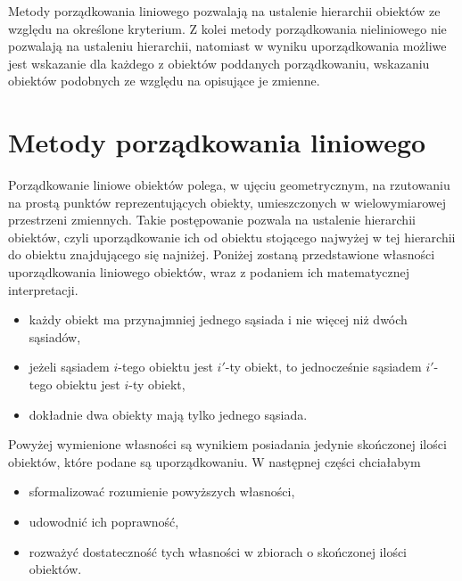 \documentclass[12pt,a4paper]{report}
\begin{document}
Metody porządkowania liniowego pozwalają na ustalenie hierarchii obiektów ze względu na określone kryterium. Z kolei metody porządkowania nieliniowego nie pozwalają na ustaleniu hierarchii, natomiast w wyniku uporządkowania możliwe jest wskazanie dla każdego z obiektów poddanych porządkowaniu, wskazaniu obiektów podobnych ze względu na opisujące je zmienne. 

\section{Metody porządkowania liniowego}
\noindent

Porządkowanie liniowe obiektów polega, w ujęciu geometrycznym, na rzutowaniu na prostą punktów reprezentujących obiekty, umieszczonych w wielowymiarowej przestrzeni zmiennych. Takie postępowanie pozwala na ustalenie hierarchii obiektów, czyli uporządkowanie ich od obiektu stojącego najwyżej w tej hierarchii do obiektu znajdującego się najniżej. Poniżej zostaną przedstawione własności uporządkowania liniowego obiektów, wraz z podaniem ich matematycznej interpretacji.

\begin{itemize}
\item każdy obiekt ma przynajmniej jednego sąsiada i nie więcej niż dwóch sąsiadów,
\item jeżeli sąsiadem $i$-tego obiektu jest $i'$-ty obiekt, to jednocześnie sąsiadem $i'$-tego obiektu jest $i$-ty obiekt,
\item dokładnie dwa obiekty mają tylko jednego sąsiada.
\end{itemize}

Powyżej wymienione własności są wynikiem posiadania jedynie skończonej ilości obiektów, które podane są uporządkowaniu. W następnej części chciałabym 
\begin{itemize}
\item sformalizować rozumienie powyższych własności,
\item udowodnić ich poprawność,
\item rozważyć dostateczność tych własności w zbiorach o skończonej ilości obiektów.
\end{itemize}
\end{document}
